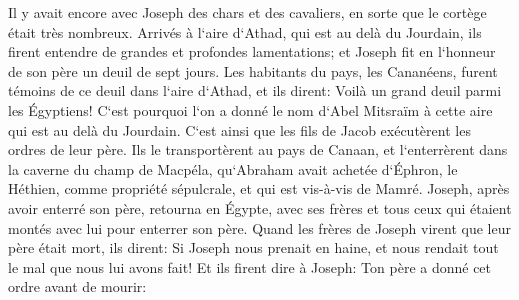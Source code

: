 \verse Il y avait encore avec Joseph des chars et des cavaliers, en sorte que le cortège était très nombreux. 
\verse Arrivés à l`aire d`Athad, qui est au delà du Jourdain, ils firent entendre de grandes et profondes lamentations; et Joseph fit en l`honneur de son père un deuil de sept jours. 
\verse Les habitants du pays, les Cananéens, furent témoins de ce deuil dans l`aire d`Athad, et ils dirent: Voilà un grand deuil parmi les Égyptiens! C`est pourquoi l`on a donné le nom d`Abel Mitsraïm à cette aire qui est au delà du Jourdain. 
\verse C`est ainsi que les fils de Jacob exécutèrent les ordres de leur père. 
\verse Ils le transportèrent au pays de Canaan, et l`enterrèrent dans la caverne du champ de Macpéla, qu`Abraham avait achetée d`Éphron, le Héthien, comme propriété sépulcrale, et qui est vis-à-vis de Mamré. 
\verse Joseph, après avoir enterré son père, retourna en Égypte, avec ses frères et tous ceux qui étaient montés avec lui pour enterrer son père. 
\verse Quand les frères de Joseph virent que leur père était mort, ils dirent: Si Joseph nous prenait en haine, et nous rendait tout le mal que nous lui avons fait! 
\verse Et ils firent dire à Joseph: Ton père a donné cet ordre avant de mourir: 
